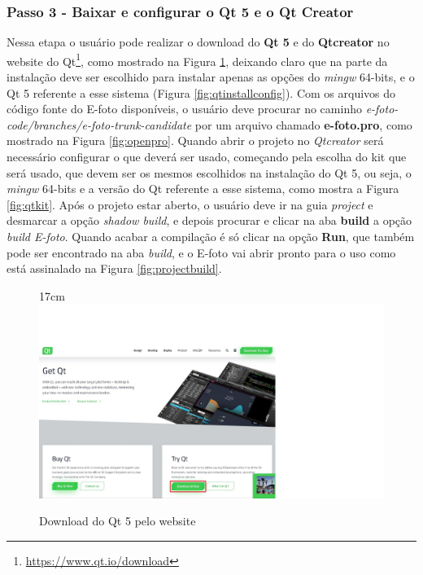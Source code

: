 \subsubsection{Passo 3 - Baixar e configurar o Qt 5 e o Qt Creator}
Nessa etapa o usuário pode realizar o download do \textbf{Qt 5} e do \textbf{Qtcreator} no website do Qt\footnote{\url{https://www.qt.io/download}}, como mostrado na Figura \ref{fig:downqt}, deixando claro que na parte da instalação deve ser escolhido para instalar apenas as opções do \textit{mingw} 64-bits, e o Qt 5 referente a esse sistema (Figura \ref{fig:qtinstallconfig}). Com os arquivos do código fonte do E-foto disponíveis, o usuário deve procurar no caminho \textit{e-foto-code/branches/e-foto-trunk-candidate} por um arquivo chamado \textbf{e-foto.pro}, como mostrado na Figura \ref{fig:openpro}. Quando abrir o projeto no \textit{Qtcreator} será necessário configurar o que deverá ser usado, começando pela escolha do kit que será usado, que devem %
 ser os mesmos escolhidos na instalação do Qt 5, ou seja, o \textit{mingw} 64-bits e a versão do Qt referente a esse sistema, como mostra a Figura \ref{fig:qtkit}. Após o projeto estar aberto, o usuário deve ir na guia \textit{project} e desmarcar a opção \textit{shadow build}, e depois procurar e clicar na aba \textbf{build} a opção \textit{build E-foto}. Quando acabar a compilação é só clicar na opção \textbf{Run}, que também pode ser encontrado na aba \textit{build}, e o E-foto vai abrir pronto para o uso como está assinalado na Figura \ref{fig:projectbuild}.
\begin{figure}[!ht]{17cm}
  	\centering
 	\includegraphics[width=12cm]{Figuras/downqt.jpg}
 	\caption{Download do Qt 5 pelo website} \label{fig:downqt}
\end{figure}

